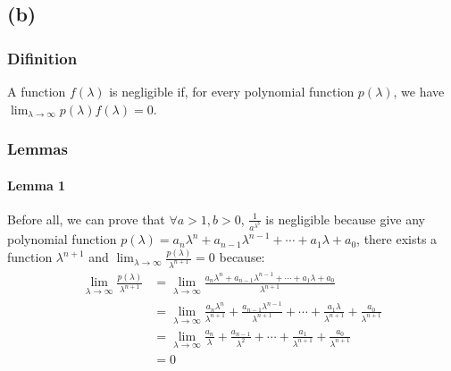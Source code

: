 \documentclass[a4paper,12pt]{article}
\begin{document}
\subsection{(b)}
\subsubsection{Difinition}
A function $f(\lambda)$ is negligible if, for every polynomial function $p(\lambda)$, we have $\lim_{\lambda \to \infty}p(\lambda)f(\lambda) = 0$.
\subsubsection{Lemmas}
\paragraph*{Lemma 1}
Before all, we can prove that $\forall a > 1, b > 0$, $\frac{1}{a^{\lambda^b}}$ is negligible because give any polynomial function $p(\lambda) = a_n\lambda^n + a_{n - 1}\lambda^{n - 1} + \cdots + a_1\lambda + a_0$, there exists a function $\lambda^{n + 1}$ and $\lim_{\lambda \to \infty}\frac{p(\lambda)}{\lambda^{n + 1}} = 0$ because:
\begin{equation}
    \begin{aligned}
        \lim_{\lambda \to \infty}\frac{p(\lambda)}{\lambda^{n + 1}} & = \lim_{\lambda \to \infty}\frac{a_n\lambda^n + a_{n - 1}\lambda^{n - 1} + \cdots + a_1\lambda + a_0}{\lambda^{n + 1}}                                                                         \\
                                                                    & = \lim_{\lambda \to \infty}\frac{a_n\lambda^n}{\lambda^{n + 1}} + \frac{a_{n - 1}\lambda^{n - 1}}{\lambda^{n + 1}} + \cdots + \frac{a_1\lambda}{\lambda^{n + 1}} + \frac{a_0}{\lambda^{n + 1}} \\
                                                                    & = \lim_{\lambda \to \infty}\frac{a_n}{\lambda} + \frac{a_{n - 1}}{\lambda^2} + \cdots + \frac{a_1}{\lambda^{n + 1}} + \frac{a_0}{\lambda^{n + 1}}                                              \\
                                                                    & = 0                                                                                                                                                                                            \\
    \end{aligned}
\end{equation}
\end{document}
